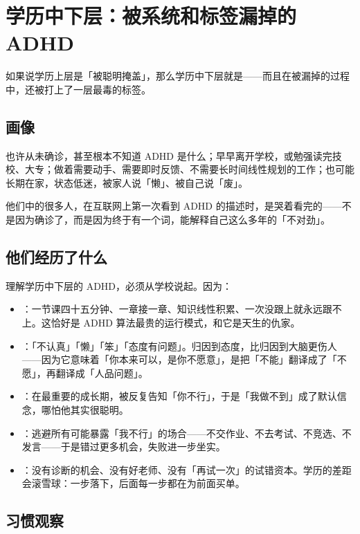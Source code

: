 \section{学历中下层：被系统和标签漏掉的 ADHD}

如果说学历上层是「被聪明掩盖」，那么学历中下层就是——而且在被漏掉的过程中，还被打上了一层最毒的标签。

\subsection{画像}

也许从未确诊，甚至根本不知道 ADHD 是什么；早早离开学校，或勉强读完技校、大专；做着需要动手、需要即时反馈、不需要长时间线性规划的工作；也可能长期在家，状态低迷，被家人说「懒」、被自己说「废」。

他们中的很多人，在互联网上第一次看到 ADHD 的描述时，是哭着看完的——不是因为确诊了，而是因为终于有一个词，能解释自己这么多年的「不对劲」。

\subsection{他们经历了什么}

理解学历中下层的 ADHD，必须从学校说起。因为：

\begin{itemize}
  \item {}：一节课四十五分钟、一章接一章、知识线性积累、一次没跟上就永远跟不上。这恰好是 ADHD 算法最贵的运行模式，和它是天生的仇家。
  \item {}：「不认真」「懒」「笨」「态度有问题」。归因到态度，比归因到大脑更伤人——因为它意味着「你本来可以，是你不愿意」，是把「不能」翻译成了「不愿」，再翻译成「人品问题」。
  \item {}：在最重要的成长期，被反复告知「你不行」，于是「我做不到」成了默认信念，哪怕他其实很聪明。
  \item {}：逃避所有可能暴露「我不行」的场合——不交作业、不去考试、不竞选、不发言——于是错过更多机会，失败进一步坐实。
  \item {}：没有诊断的机会、没有好老师、没有「再试一次」的试错资本。学历的差距会滚雪球：一步落下，后面每一步都在为前面买单。
\end{itemize}

\subsection{习惯观察}


